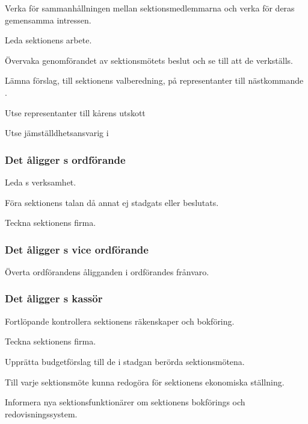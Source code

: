 \begin{att}
	\item Verka för sammanhållningen mellan sektionsmedlemmarna och verka för deras gemensamma intressen.
	\item Leda sektionens arbete.
	\item Övervaka genomförandet av sektionsmötets beslut och se till att de verkställs.
	\item Lämna förslag, till sektionens valberedning, på representanter till nästkommande \STYRIT.
	\item Utse representanter till kårens utskott
	\item Utse jämställdhetsansvarig i \STYRIT
\end{att}

\subsubsection{Det åligger \STYRIT{}s ordförande}
\begin{att}
	\item Leda \STYRIT{}s verksamhet.
	\item Föra sektionens talan då annat ej stadgats eller beslutats.
	\item Teckna sektionens firma.
\end{att}

\subsubsection{Det åligger \STYRIT{}s vice ordförande}
\begin{att}
	\item Överta ordförandens åligganden i ordförandes frånvaro.
\end{att}

\subsubsection{Det åligger \STYRIT{}s kassör}
\begin{att}
	\item Fortlöpande kontrollera sektionens räkenskaper och bokföring.
	\item Teckna sektionens firma.
	\item Upprätta budgetförslag till de i stadgan berörda sektionsmötena.
	\item Till varje sektionsmöte kunna redogöra för sektionens ekonomiska ställning.
	\item Informera nya sektionsfunktionärer om sektionens bokförings och redovisningssystem.
\end{att}
 
